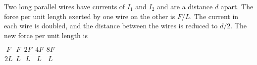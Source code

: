 \begin{questions}\setcounter{question}{2}\question
Two long parallel wires have currents of $I_{1}$ and $I_{2}$ and are a distance $d$ apart. The force per unit length exerted by one wire on the other is $F / L$. The current in each wire is doubled, and the distance between the wires is reduced to $d / 2$. The new force per unit length is

\begin{oneparchoices}
\choice $\dfrac{F}{2 L}$
\choice $\dfrac{F}{L}$
\choice $\dfrac{2 F}{L}$
\choice $\dfrac{4 F}{L}$
\choice $\dfrac{8 F}{L}$
\end{oneparchoices}\end{questions}
